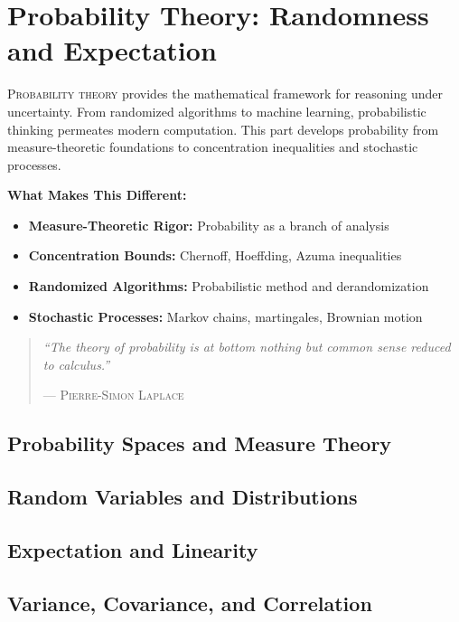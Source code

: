 \part{Probability Theory: Randomness and Expectation}
\label{part:probability}

\begin{partintro}
\lettrine[lines=3]{P}{robability theory} provides the mathematical framework for reasoning under uncertainty. From randomized algorithms to machine learning, probabilistic thinking permeates modern computation. This part develops probability from measure-theoretic foundations to concentration inequalities and stochastic processes.

\vspace{1em}
\textbf{What Makes This Different:}
\begin{itemize}[noitemsep]
    \item \textbf{Measure-Theoretic Rigor:} Probability as a branch of analysis
    \item \textbf{Concentration Bounds:} Chernoff, Hoeffding, Azuma inequalities
    \item \textbf{Randomized Algorithms:} Probabilistic method and derandomization
    \item \textbf{Stochastic Processes:} Markov chains, martingales, Brownian motion
\end{itemize}

\begin{quote}
\textit{``The theory of probability is at bottom nothing but common sense reduced to calculus.''}

\hfill--- \textsc{Pierre-Simon Laplace}
\end{quote}
\end{partintro}

\chapter{Probability Spaces and Measure Theory}
\chapter{Random Variables and Distributions}
\chapter{Expectation and Linearity}
\chapter{Variance, Covariance, and Correlation}
